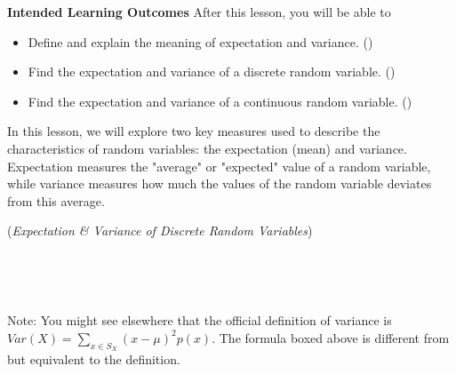 \documentclass[10pt]{article}
\begin{document}
\thispagestyle{firstpage}
\pagestyle{otherpages}


\textbf{Intended Learning Outcomes}
After this lesson, you will be able to 

\begin{itemize}
    \item Define and explain the meaning of expectation and variance. ()
    \item Find the expectation and variance of a discrete random variable. ()
    \item Find the expectation and variance of a continuous random variable. ()
\end{itemize}

\vspace{-0.5cm}

\hrulefill

In this lesson, we will explore two key measures used to describe the characteristics of random variables: the expectation (mean) and variance. Expectation measures the "average" or "expected" value of a random variable, while variance measures how much the values of the random variable deviates from this average.

\begin{center}
({\it Expectation \& Variance of Discrete Random Variables})
\end{center}

\,\hfill{} \hfill\,

\,\hfill {}\hfill\,

Note: You might see elsewhere that the official definition of variance is $Var(X)=\displaystyle\sum_{x\in S_X}(x-\mu)^2p(x)$. The formula boxed above is different from but equivalent to the definition.

\end{document}
